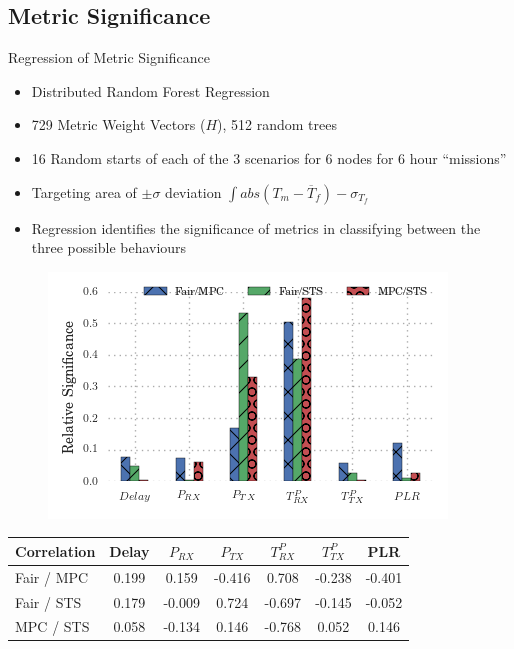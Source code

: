 \documentclass{beamer}
\begin{document}
\subsection{Metric Significance}
\begin{frame}[allowframebreaks]{Regression of Metric Significance}
  \begin{itemize}
    \item Distributed Random Forest Regression \cite{Breiman2001} 
    \item 729 Metric Weight Vectors ($H$), 512 random trees
    \item 16 Random starts of each of the 3 scenarios for 6 nodes for 6 hour ``missions''
    \item Targeting area of $\pm\sigma$ deviation $\int abs(T_m - \overline T_f) - \sigma_{T_f}$
    \item Regression identifies the significance of metrics in classifying between the three possible behaviours
  \end{itemize}

  \framebreak

  \begin{figure}
    \centering
    \includegraphics[width=0.95\linewidth]{img/MaliciousSelfishMetricFactors}
    \label{fig:malselfactors}
  \end{figure}
  \vspace{-30pt}%
  \begin{table}[h]
    \begin{center}
      \small
      \bgroup
      \def\arraystretch{1.2}%
      \setlength\tabcolsep{4pt}%
      \begin{tabular}{l|CCCCCC}
        \toprule
        Correlation      & Delay & $P_{RX}$ & $P_{TX}$ & $T^P_{RX}$ & $T^P_{TX}$ & PLR \\
        \midrule
        Fair / MPC       & 0.199 &  0.159   & -0.416  &  0.708   & -0.238   & -0.401\\
        Fair / STS       & 0.179 &  -0.009  &  0.724  & -0.697   & -0.145   & -0.052\\
        MPC / STS        & 0.058 &  -0.134  &  0.146  & -0.768   &  0.052   &  0.146\\
        \bottomrule
      \end{tabular}
      \egroup
    \end{center}
  \end{table}


\end{frame}
\end{document}
